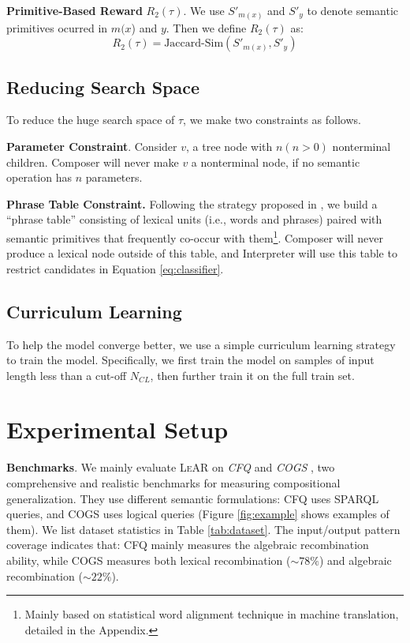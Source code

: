 \documentclass[11pt,a4paper]{article}
\begin{document}
\noindent \textbf{Primitive-Based Reward} $R_2(\tau)$.
We use $S'_{m(x)}$ and $S'_y$ to denote semantic primitives ocurred in $m(x$) and $y$.
Then we define $R_2(\tau)$ as:
\begin{equation}\label{eq:reward_atom}
    R_{2}\left({\tau}\right) = 
    \text{Jaccard-Sim}(S'_{m(x)}, S'_y)
\end{equation}

\subsection{Reducing Search Space}
To reduce the huge search space of $\tau$, we make two constraints as follows.

\noindent \textbf{Parameter Constraint}.
Consider $v$, a tree node with $n (n>0)$ nonterminal children.
Composer will never make $v$ a nonterminal node, if no semantic operation has $n$ parameters.

\noindent \textbf{Phrase Table Constraint.}
Following the strategy proposed in \citet{guo2020hierarchical}, we build a ``phrase table'' consisting of lexical units (i.e., words and phrases) paired with semantic primitives that frequently co-occur with them\footnote{Mainly based on statistical word alignment technique in machine translation, detailed in the Appendix.}.
Composer will never produce a lexical node outside of this table, and Interpreter will use this table to restrict candidates in Equation \ref{eq:classifier}.



\subsection{Curriculum Learning} \label{sec:curriculum}

To help the model converge better, we use a simple curriculum learning \cite{bengio2009curriculum} strategy to train the model.
Specifically, we first train the model on samples of input length less than a cut-off $N_{CL}$, then further train it on the full train set.







\section{Experimental Setup}

\noindent \textbf{Benchmarks}.
We mainly evaluate \textsc{LeAR} on \textit{CFQ} \cite{keysers2019measuring} and \textit{COGS} \cite{kim2020cogs}, two comprehensive and realistic benchmarks for measuring compositional generalization.
They use different semantic formulations:
CFQ uses SPARQL queries, and COGS uses logical queries (Figure \ref{fig:example} shows examples of them).
We list dataset statistics in Table \ref{tab:dataset}.
The input/output pattern coverage indicates that:
CFQ mainly measures the algebraic recombination ability, while COGS measures both lexical recombination ($\sim78\%$) and algebraic recombination ($\sim22\%$).
\end{document}
